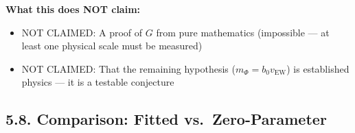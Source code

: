 \documentclass[
  11pt,
]{article}
\providecommand{\tightlist}{%
  \setlength{\itemsep}{0pt}\setlength{\parskip}{0pt}}
\begin{document}
\textbf{What this does NOT claim:}

\begin{itemize}
\tightlist
\item
  NOT CLAIMED: A proof of \(G\) from pure mathematics (impossible --- at
  least one physical scale must be measured)
\item
  NOT CLAIMED: That the remaining hypothesis
  (\(m_\Phi = b_0 v_{\text{EW}}\)) is established physics --- it is a
  testable conjecture
\end{itemize}

\bigskip

\hypertarget{comparison-fitted-vs.-zero-parameter}{%
\subsection{5.8. Comparison: Fitted
vs.~Zero-Parameter}\label{comparison-fitted-vs.-zero-parameter}}
\end{document}

